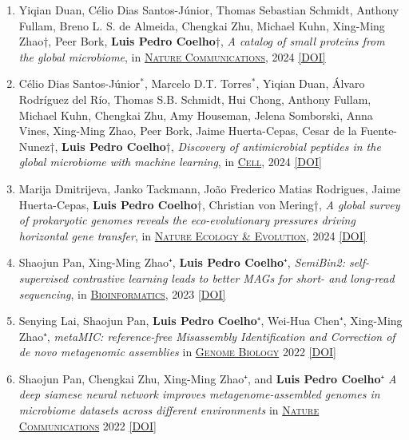\documentclass{article}
\newcommand\showdoi[1]{%
    \href{http://dx.doi.org/#1}{[DOI]}%
}
\newcommand\pubname[1]{\textsc{\uline{#1}}}
\newcommand\costar{${}^{*}$}
\newcommand\cosenior{†}
\begin{document}
\begin{enumerate}[resume]

\item Yiqian Duan, Célio Dias Santos-Júnior, Thomas Sebastian Schmidt, Anthony Fullam, Breno L. S. de Almeida, Chengkai Zhu, Michael Kuhn, Xing-Ming Zhao\cosenior, Peer Bork, \textbf{Luis Pedro Coelho}\cosenior, \emph{A catalog of small proteins from the global microbiome}, in \pubname{Nature Communications}, 2024 \showdoi{10.1038/s41467-024-51894-6}

\item Célio Dias Santos-Júnior\costar, Marcelo D.T. Torres\costar, Yiqian Duan, Álvaro Rodríguez del Río, Thomas S.B. Schmidt, Hui Chong, Anthony Fullam, Michael Kuhn, Chengkai Zhu, Amy Houseman, Jelena Somborski, Anna Vines, Xing-Ming Zhao, Peer Bork, Jaime Huerta-Cepas, Cesar de la Fuente-Nunez\cosenior, \textbf{Luis Pedro Coelho}\cosenior, \emph{Discovery of antimicrobial peptides in the global microbiome with machine learning}, in \pubname{Cell}, 2024 \showdoi{10.1016/j.cell.2024.05.013}

\item Marija Dmitrijeva, Janko Tackmann, João Frederico Matias Rodrigues, Jaime Huerta-Cepas, \textbf{Luis Pedro Coelho}\cosenior, Christian von Mering\cosenior, \emph{A global survey of prokaryotic genomes reveals the eco-evolutionary pressures driving horizontal gene transfer}, in \pubname{Nature Ecology \& Evolution}, 2024 \showdoi{10.1038/s41559-024-02357-0}

\item Shaojun Pan, Xing-Ming Zhao⁺, \textbf{Luis Pedro Coelho}⁺, \emph{SemiBin2: self-supervised contrastive learning leads to better MAGs for short- and long-read sequencing}, in \pubname{Bioinformatics}, 2023 \showdoi{10.1093/bioinformatics/btad209}

\item Senying Lai, Shaojun Pan, \textbf{Luis Pedro Coelho}⁺, Wei-Hua Chen⁺,
Xing-Ming Zhao⁺, \emph{metaMIC: reference-free Misassembly Identification and
Correction of de novo metagenomic assemblies} in \pubname{Genome Biology} 2022
\showdoi{10.1186/s13059-022-02810-y}


\item Shaojun Pan, Chengkai Zhu, Xing-Ming Zhao⁺, and \textbf{Luis Pedro
Coelho}⁺ \emph{A deep siamese neural network improves metagenome-assembled
genomes in microbiome datasets across different environments} in
\pubname{Nature Communications} 2022 \showdoi{10.1038/s41467-022-29843-y}


\end{enumerate}
\end{document}
